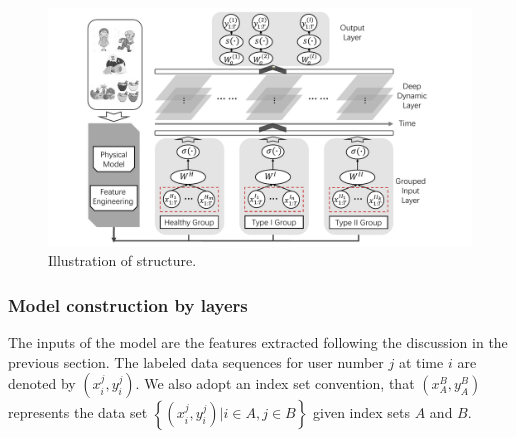 \begin{figure}[h]
  \centering
  \includegraphics[width=0.9\columnwidth]{./img/pics_RNN2.pdf}
  \caption{Illustration of \modelname structure.}
  \label{fig:rnn}
\end{figure}

\subsubsection{Model construction by layers}
The inputs of the \modelname model are the features extracted following the discussion in the previous section.
The labeled data sequences for user number $j$ at time $i$ are denoted by $(x_i^{j},y_i^{j})$.
We also adopt an index set convention, that $(x_A^{B},y_A^B)$ represents the data set $\left\{(x_i^{j},y_i^{j}) | i \in A, j\in B\right\}$ given index sets $A$ and $B$.

